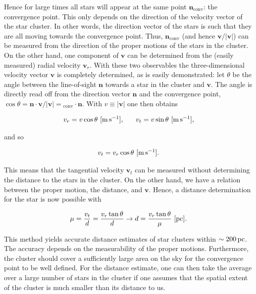 \documentclass[a4paper,11pt]{article}
\begin{document}
{\noindent}Hence for large times all stars will appear at the same point $\mathbf{n}_\mathrm{conv}$: the convergence point. This only depends on the direction of the velocity vector of the star cluster. In other words, the direction vector of the stars is such that they are all moving towards the convergence point. Thus, $\mathbf{n}_\mathrm{conv}$ (and hence $\mathbf{v}/\lvert\mathbf{v}\rvert$) can be measured from the direction of the proper motions of the stars in the cluster. On the other hand, one component of $\mathbf{v}$ can be determined from the (easily measured) radial velocity $\mathbf{v}_r$. With these two observables the three-dimensional velocity vector $\mathbf{v}$ is completely determined, as is easily demonstrated: let $\theta$ be the angle between the line-of-sight $\mathbf{n}$ towards a star in the cluster and $\mathbf{v}$. The angle is directly read off from the direction vector $\mathbf{n}$ and the convergence point, $\cos\theta = \mathbf{n}\cdot\mathbf{v}/\lvert\mathbf{v}\rvert = \mathbf{}_\mathrm{conv}\cdot\mathbf{n}$. With $v\equiv\lvert\mathbf{v}\rvert$ one then obtains

\begin{align*}
    v_r = v\cos\theta ~ [{\rm m\,s^{-1}}], ~~~~~ v_t = v\sin\theta ~ [{\rm m\,s^{-1}}],
\end{align*}

{\noindent}and so

\begin{align*}
    v_t = v_r\cos\theta ~ [{\rm m\,s^{-1}}].
\end{align*}

{\noindent}This means that the tangential velocity $\mathbf{v}_t$ can be measured without determining the distance to the stars in the cluster. On the other hand, we have a relation between the proper motion, the distance, and $\mathbf{v}$. Hence, a distance determination for the star is now possible with

\begin{align*}
    \mu = \frac{v_t}{d} = \frac{v_r\tan\theta}{d} \rightarrow d = \frac{v_r\tan\theta}{\mu} ~ [{\rm pc}].
\end{align*}

{\noindent}This method yields accurate distance estimates of star clusters within $\sim200\,{\rm pc}$. The accuracy depends on the measurability of the proper motions. Furthermore, the cluster should cover a sufficiently large area on the sky for the convergence point to be well defined. For the distance estimate, one can then take the average over a large number of stars in the cluster if one assumes that the spatial extent of the cluster is much smaller than its distance to us.
\end{document}

